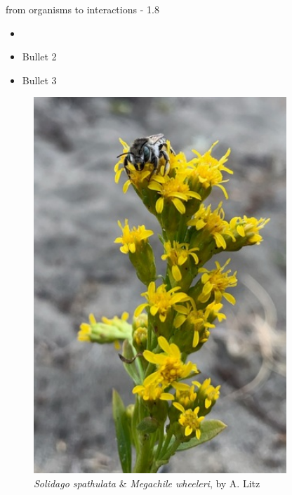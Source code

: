 \documentclass[
  ignorenonframetext,
]{beamer}
\providecommand{\tightlist}{%
  \setlength{\itemsep}{0pt}\setlength{\parskip}{0pt}}
\begin{document}
\begin{frame}{from organisms to interactions - 1.8}
\protect\hypertarget{from-organisms-to-interactions---1.8}{}
\begin{itemize}
\tightlist
\item
\item
  Bullet 2
\item
  Bullet 3
\end{itemize}

\begin{figure}
\centering
\includegraphics[width=0.85\textwidth,height=\textheight]{../graphics/pictures/Megachile_Solidago.resized.jpg}
\caption{\emph{Solidago spathulata} \& \emph{Megachile wheeleri}, by A.
Litz}
\end{figure}
\end{frame}
\end{document}

